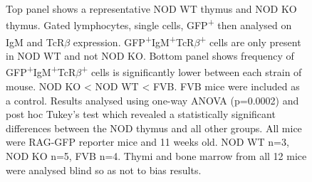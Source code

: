 \begin{figure}
{Top panel shows a representative NOD WT thymus and NOD KO thymus.
Gated lymphocytes, single cells, GFP\textsuperscript{+} then analysed on IgM and TcR$\beta$ expression.
GFP\textsuperscript{+}IgM\textsuperscript{+}TcR$\beta$\textsuperscript{+} cells are only present in NOD WT and not NOD KO.
Bottom panel shows frequency of GFP\textsuperscript{+}IgM\textsuperscript{+}TcR$\beta$\textsuperscript{+} cells is significantly lower between each strain of mouse. NOD KO < NOD WT < FVB. FVB mice were included as a control.
Results analysed using one-way ANOVA (p=0.0002) and post hoc Tukey's test which revealed a statistically significant differences between the NOD thymus and all other groups.
All mice were RAG-GFP reporter mice and 11 weeks old. NOD WT n=3, NOD KO n=5, FVB n=4.
Thymi and bone marrow from all 12 mice were analysed blind so as not to bias results.}
\label{fig:RAGIgMTcRpos}
\end{figure}














